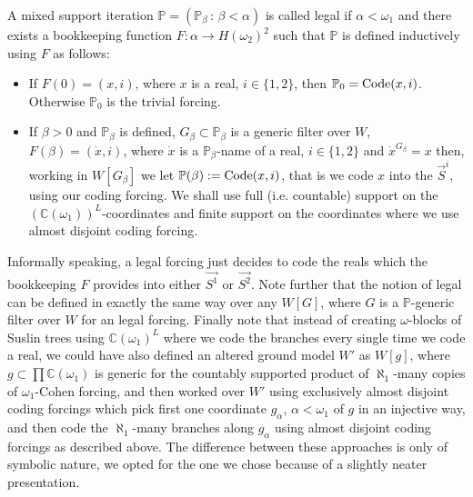 \documentclass[10pt,a4paper]{amsart}
\newcommand{\forceP}{\mathbb{P}}
\begin{document}
\begin{definition}
A mixed support iteration $\forceP=(\forceP_{\beta}\,:\, {\beta< \alpha})$ is called legal if $\alpha < \omega_1$ and there exists a bookkeeping function $F: \alpha \rightarrow H(\omega_2)^2$ such that 
 $\forceP$ is defined inductively using $F$ as follows:
 \begin{itemize}
 \item If $F(0)=(x,i)$, where $x$ is a real, $i\in \{1,2\}$, then $\forceP_0= \hbox{Code}({x,i} )$. Otherwise $\forceP_0$ is the trivial forcing.
 \item If $\beta>0$ and $\forceP_{\beta}$ is defined, $G_{\beta} \subset \forceP_{\beta}$ is a generic filter over $W$, $F(\beta)=(\dot{x}, i)$, where $\dot{x}$ is a $\forceP_{\beta}$-name of a real, $i \in \{1,2\}$ and $\dot{x}^{G_{\beta}}=x$ then, working in $W[G_{\beta}]$ we let
 $\forceP(\beta):= \hbox{Code} ({x,i} )$, that is we code $x$ into the $\vec{S}^i$, using our coding forcing. We shall use full (i.e. countable) support on the $(\mathbb{C}(\omega_1))^L$-coordinates and finite support on the coordinates where we use almost disjoint coding forcing.
 \end{itemize}
 
\end{definition}
 Informally speaking, a legal  forcing just decides to code the reals which the bookkeeping $F$ provides into either $\vec{S^1}$ or $\vec{S^2}$. Note further that the notion of legal  can be defined in exactly the same way over any $W[G]$, where $G$ is a $\forceP$-generic filter over $W$ for an legal  forcing. Finally note that instead of creating $\omega$-blocks of Suslin trees using $\mathbb{C} (\omega_1)^L$ where we code the branches every single time we code a real, we could have also defined an altered ground model $W'$ as $W[g]$, where $g \subset \prod \mathbb{C} (\omega_1)$ is generic for the countably supported product of $\aleph_1$-many copies of $\omega_1$-Cohen forcing, and then worked over $W'$ using exclusively almost disjoint coding forcings which pick first one coordinate $g_{\alpha}$, $\alpha< \omega_1$ of $g$ in an injective way, and then code the $\aleph_1$-many branches along $g_{\alpha}$ using almost disjoint coding forcings as described above. The difference between these approaches is only of symbolic nature, we opted for the one we chose because of a slightly neater presentation. 
 
\end{document}
